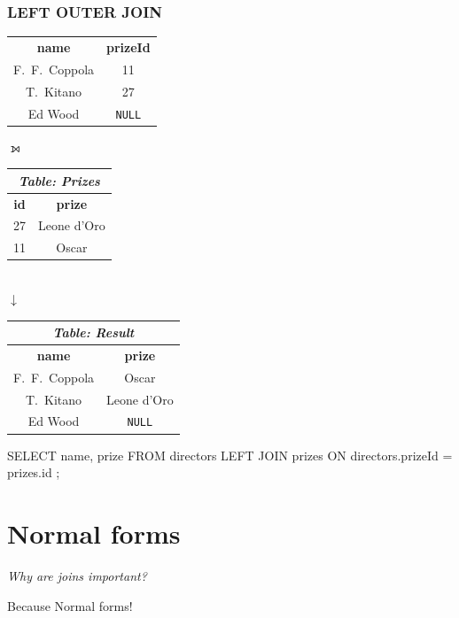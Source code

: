\documentclass[english,serif,mathserif]{beamer}
\begin{document}
\begin{frame}[fragile]
  \frametitle{LEFT OUTER JOIN}

  \begin{center}
    \begin{tabular}{cc}
      \rowcolor{white}\multicolumn{2}{c}{\em Table: Directors}
      \\
      \hline
      \textbf{name} & \textbf{prizeId}
      \\
      \hline
      F.~F.~Coppola & 11
      \\
      T.~Kitano & 27
      \\
      Ed Wood & \texttt{NULL}
    \end{tabular}
    {\color{gray}$\pmb\leftouterjoin$}
    \begin{tabular}{cc}
      \multicolumn{2}{c}{\em Table: Prizes}
      \\
      \hline
      \textbf{id} & \textbf{prize}
      \\
      \hline
      27 & Leone d'Oro
      \\
      11 & Oscar
    \end{tabular}
    \\
    {\color{gray}$\pmb\downarrow$}
    \\
    \begin{tabular}{cc}
      \multicolumn{2}{c}{\em Table: Result}
      \\
      \hline
      \textbf{name} & \textbf{prize}
      \\
      \hline
      F.~F.~Coppola & Oscar
      \\
      T.~Kitano & Leone d'Oro
      \\
      Ed Wood & \texttt{NULL}
    \end{tabular}

    \+
    \begin{minipage}{32ex}
    \begin{sql}
SELECT name, prize
FROM directors LEFT JOIN prizes
ON directors.prizeId = prizes.id ;
    \end{sql}
  \end{minipage}
  \end{center}
\end{frame}


\section{Normal forms}
\begin{frame}
  \begin{center}
    {\Large\em Why are joins important?}

    \+
    {\Large Because Normal forms!}
  \end{center}
\end{frame}
\end{document}
